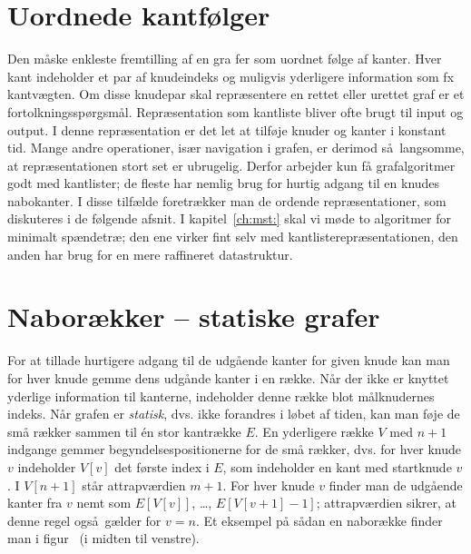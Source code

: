 \section{Uordnede kantfølger}

Den måske enkleste fremtilling af en gra fer som uordnet følge af kanter.
Hver kant indeholder et par af knudeindeks og muligvis yderligere information som fx kantvægten.
Om disse knudepar skal repræsentere en rettet eller urettet graf er et fortolkningsspørgsmål.
Repræsentation som kantliste bliver ofte brugt til input og output.
I denne repræsentation er det let at tilføje knuder og kanter i konstant tid.
Mange andre operationer, især navigation i grafen, er derimod så langsomme, at repræsentationen stort set er ubrugelig.
Derfor arbejder kun få grafalgoritmer godt med kantlister;
de fleste har nemlig brug for hurtig adgang til en knudes nabokanter.
I disse tilfælde foretrækker man de ordende repræsentationer, som diskuteres i de følgende afsnit.
I kapitel~\ref{ch:mst:} skal vi møde to algoritmer for minimalt spændetræ;
den ene virker fint selv med kant\-liste\-repræsentationen, den anden har brug for en mere raffineret datastruktur.
 
\section{Naborækker -- statiske grafer}
%
%
%

For at tillade hurtigere adgang til de udgående kanter for given knude kan man for hver knude gemme dens udgånde kanter i en række.
Når der ikke er knyttet yderlige information til kanterne, indeholder denne række blot målknudernes indeks.
Når grafen er \emph{statisk}, dvs. ikke forandres i løbet af tiden, kan man føje de små rækker sammen til én stor kantrække $E$.
En yderligere række $V$ med $n+1$ indgange gemmer begyndelsespositionerne for de små rækker, dvs. for hver knude $v$ indeholder $V[v]$ det første index i $E$, som indeholder en kant med startknude $v$.
I $V[n+1]$ står attrapværdien $m+1$.
For hver knude $v$ finder man de udgående kanter fra $v$ nemt som $E[V[v]]$, \ldots, $E[V[v+1]-1]$;
attrapværdien sikrer, at denne regel også gælder for $v=n$.
Et eksempel på sådan en naborække finder man i figur~ (i midten til venstre).

